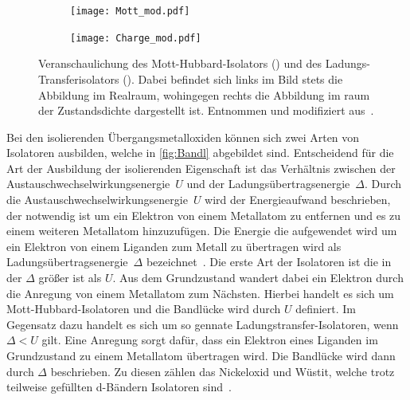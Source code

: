         \begin{figure}
            \centering
            \begin{subfigure}{0.48\textwidth}
                \centering
                \texttt{[image: Mott\_mod.pdf]}
                \subcaption{}
                \label{fig:Mott}
            \end{subfigure}
            \begin{subfigure}{0.48\textwidth}
                \centering
                \texttt{[image: Charge\_mod.pdf]}
                \subcaption{}
                \label{fig:Charge}
            \end{subfigure}
            \caption{Veranschaulichung des Mott-Hubbard-Isolators () und des Ladungs-Transferisolators ().
            Dabei befindet sich links im Bild stets die Abbildung im Realraum, wohingegen rechts die Abbildung im raum der Zustandsdichte dargestellt ist.
            Entnommen und modifiziert aus~\cite{stohr_magnetism_2006}.}
            \label{fig:Bandl}
        \end{figure}
        Bei den isolierenden Übergangsmetalloxiden können sich zwei Arten von Isolatoren ausbilden, welche in \autoref{fig:Bandl} abgebildet sind.
        Entscheidend für die Art der Ausbildung der isolierenden Eigenschaft ist das Verhältnis zwischen der Austauschwechselwirkungsenergie~$U$ und der Ladungsübertragsenergie~$\Delta$.
        Durch die Austauschwechselwirkungsenergie~$U$ wird der Energieaufwand beschrieben, der notwendig ist um ein Elektron von einem Metallatom zu entfernen und es zu einem weiteren Metallatom hinzuzufügen.
        Die Energie die aufgewendet wird um ein Elektron von einem Liganden zum Metall zu übertragen wird als Ladungsübertragsenergie~$\Delta$ bezeichnet~\cite{stohr_magnetism_2006}.
        Die erste Art der Isolatoren ist die in der $\Delta$ größer ist als $U$.
        Aus dem Grundzustand wandert dabei ein Elektron durch die Anregung von einem Metallatom zum Nächsten.
        Hierbei handelt es sich um Mott-Hubbard-Isolatoren und die Bandlücke wird durch $U$ definiert.
        Im Gegensatz dazu handelt es sich um so gennate Ladungstransfer-Isolatoren, wenn $\Delta < U$ gilt.
        Eine Anregung sorgt dafür, dass ein Elektron eines Liganden im Grundzustand zu einem Metallatom übertragen wird.
        Die Bandlücke wird dann durch $\Delta$ beschrieben.
        Zu diesen zählen das Nickeloxid und Wüstit, welche trotz teilweise gefüllten d-Bändern Isolatoren sind~\cite{IF_5}.

